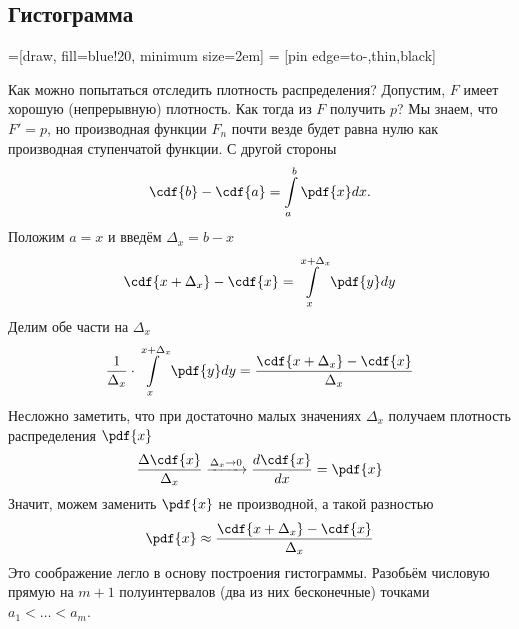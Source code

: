 \subsection{Гистограмма}
\label{subsection:histogram}
=[draw, fill=blue!20, minimum size=2em]
 = [pin edge={to-,thin,black}]

Как можно попытаться отследить плотность распределения?
Допустим, $F$ имеет хорошую (непрерывную) плотность.
Как тогда из $F$ получить $p$?
Мы знаем, что $F'=p$, но производная функции $F_n$ почти везде будет равна нулю
как производная ступенчатой функции.
С другой стороны
\begin{equation*}
  \cdf{b}-\cdf{a}= \int\limits_a^b \pdf{x} dx.
\end{equation*}
Положим $a=x$ и введём $\Delta_x=b-x$
$$\cdf{x+ \Delta_x}-\cdf{x}=\int\limits_x^{x+\Delta_x} \pdf{y} dy$$
Делим обе части на $\Delta_x$
\begin{equation*}
  \frac{1}{\Delta_x}\cdot\int\limits_x^{x+ \Delta_x} \pdf{y} dy
   = \frac{\cdf{x+ \Delta_x}-\cdf{x}}{\Delta_x}
\end{equation*}
Несложно заметить, что при достаточно малых значениях $\Delta_x$
получаем плотность распределения $\pdf{x}$
\begin{equation*}
  \frac{\Delta\cdf{x}}{\Delta_x} \xrightarrow[]{\Delta_x\to 0}
    \frac{d\cdf{x}}{dx}
  = \pdf{x}
\end{equation*}
Значит, можем заменить $\pdf{x}$ не производной, а такой разностью
\begin{equation*}
  \pdf{x}\approx\frac{\cdf{x+ \Delta_x}-\cdf{x}}{\Delta_x}
\end{equation*}
Это соображение легло в основу построения гистограммы.
Разобьём числовую прямую на $m+1$ полуинтервалов (два из них бесконечные)
точками $a_1 < \dots < a_m$.
\begin{comment}
Возьмём $m$ полуинтервалов на числовой прямой
$I_j= \left(a_{j-1},a_j\right], i=\overline{1,m}$
таких, каждое значение выборки попадает в свой интервал.
Для этого определим пару свойств точек, ограничивающих эти интервалы:
\begin{enumerate}
  \item Каждая следующая точка строго правее (больше) предыдущей
    (так как зачем нам одинаковые точки?)
    $$a_0<a_1<\dots<a_m$$
  \item Каждое значение выборки должно попадать ровно в один полуинтервал.
    Очевидно, что данные полуинтервалы $I_j$ не пересекаются между собой.
    Значит, осталось потребовать, чтобы
    крайнее левое значение было меньше минимального значения из выборки,
    а крайнее правое --- не меньше максимального
    $$a_0<min\left(X\right)\le max\left(X\right)\le a_m$$
\end{enumerate}

Введём функцию $q\left(y\right)$
$$q\left(y\right)
= \sum_{j=1}^m \frac{\cdf{a_j}-\cdf{a_{j-1}}}{a_j-a_{j-1}}
  \cdot\indicator{y\in I_j}$$
\end{comment}
